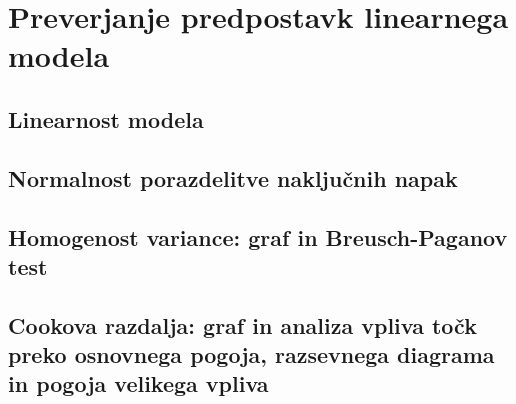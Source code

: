 \section{Preverjanje predpostavk linearnega modela}
\subsection{Linearnost modela}
\subsection{Normalnost porazdelitve naključnih napak}
\subsection{Homogenost variance: graf in Breusch-Paganov test}
\subsection{Cookova razdalja: graf in analiza vpliva točk preko osnovnega pogoja, razsevnega diagrama in pogoja velikega vpliva}